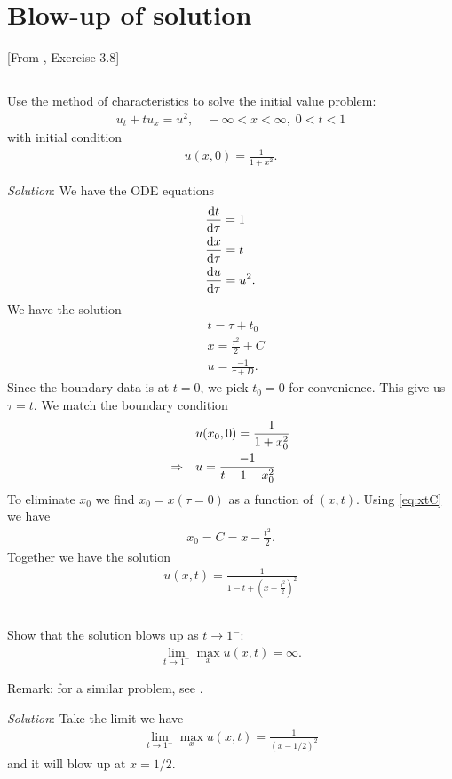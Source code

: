 \documentclass[11pt,letterpaper]{article}
\begin{document}
\addtocounter{section}{2}
\section{Blow-up of solution}
[From \cite{ShearerLevy_15}, Exercise 3.8] 

\subsection{}
Use the method of characteristics to solve the initial value problem: 
\begin{align}
    u_t+tu_x = u^2,\quad -\infty<x<\infty,\; 0<t<1
\end{align}
with initial condition 
\begin{align}
    u(x,0) = \frac{1}{1+x^2}.
\end{align}

\textit{Solution}: We have the ODE equations
\begin{align}
    &\frac{\mathrm{d} t}{\mathrm{d} \tau} = 1\\
    &\frac{\mathrm{d} x}{\mathrm{d} \tau} = t\\
    &\frac{\mathrm{d} u}{\mathrm{d} \tau} = u^2.
\end{align}
We have the solution
\begin{align}
    &t = \tau+t_0\\
    &x = \frac{\tau^2}{2}+C\label{eq:xtC}\\
    &u = \frac{-1}{\tau+D}.
\end{align}
Since the boundary data is at $t=0$, we pick $t_0=0$ for convenience. This give us $\tau = t$. We match the boundary condition
\begin{align}
    &u(x_0,0) = \frac{1}{1+x_0^2}\\
    \Rightarrow \quad &u = \frac{-1}{t-1-x_0^2}
\end{align}
To eliminate $x_0$ we find $x_0=x(\tau=0)$ as a function of $(x,t)$. Using \eqref{eq:xtC} we have
\begin{align}
    x_0 = C = x-\frac{t^2}{2}.
\end{align}
Together we have the solution
\begin{align}
    u(x,t) = \frac{1}{1-t+(x-\frac{t^2}{2})^2}
\end{align}

\subsection{}
Show that the solution blows up as $t\to 1^-$:
\begin{align}
    \lim_{t\to 1^-} \max_x u(x,t) = \infty.
\end{align}

Remark: for a similar problem, see \cite[Exercise 2.2.11]{Olver_14}.

\textit{Solution}: Take the limit we have
\begin{align}
    \lim_{t\to 1^-} \max_x u(x,t) = \frac{1}{(x-1/2)^2}
\end{align}
and it will blow up at $x=1/2$.

    
\vfill
\printbibliography
\end{document}
